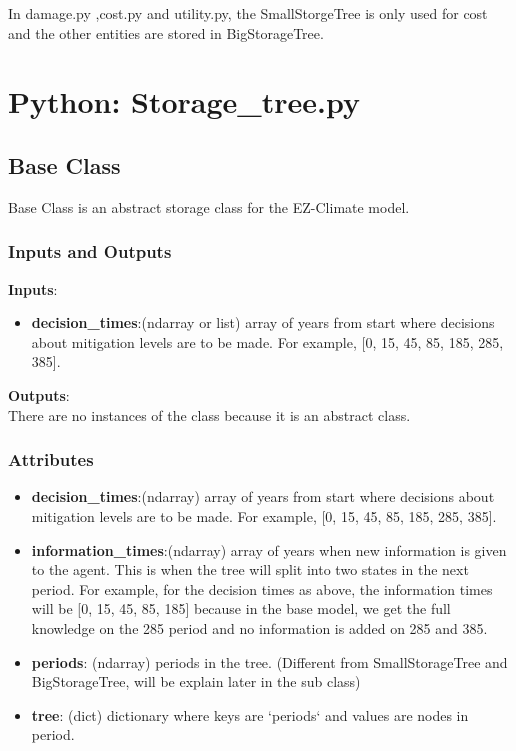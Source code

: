 \documentclass[12pt]{article}
\begin{document}
In damage.py ,cost.py and utility.py, the SmallStorgeTree is only used for cost and the other entities are stored in BigStorageTree.

\section{Python: Storage\_tree.py}
\subsection{Base Class}
Base Class is an abstract storage class for the EZ-Climate model.
\subsubsection{Inputs and Outputs}
\textbf{Inputs}:
\begin{itemize}
\item \textbf{decision\_times}:(ndarray or list) array of years from start where decisions about mitigation levels are to be made. For example, [0, 15, 45, 85, 185, 285, 385].
\end{itemize}
\textbf{Outputs}:\\
There are no instances of the class because it is an abstract class.
\subsubsection{Attributes}
\begin{itemize}
\item \textbf{decision\_times}:(ndarray) array of years from start where decisions about mitigation levels are to be made. For example, [0, 15, 45, 85, 185, 285, 385].
\item \textbf{information\_times}:(ndarray) array of years when new information is given to the agent. This is when the tree will split into two states in the next period. For example, for the decision times as above, the information times will be  [0, 15, 45, 85, 185] because in the base model, we get the full knowledge on the 285 period and no information is added on 285 and 385.
\item \textbf{periods}: (ndarray) 	periods in the tree. (Different from SmallStorageTree and BigStorageTree, will be explain later in the sub class)
\item \textbf{tree}: (dict) dictionary where keys are `periods` and values are nodes in period.
\end{itemize}
\end{document}
